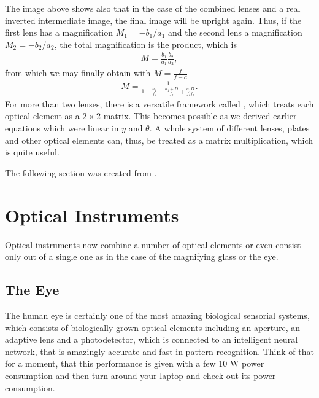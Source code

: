 \documentclass[letterpaper,10pt,english]{sphinxmanual}
\begin{document}
The image above shows also that in the case of the combined lenses and a real inverted intermediate image, the final image will be upright again. Thus, if the first lens has a magnification \(M_1=-b_1/a_1\) and the second lens a magnification \(M_2=-b_2/a_2\), the total magnification is the product, which is
\begin{equation*}
\begin{split}M=\frac{b_1}{a_1}\frac{b_2}{a_2},\end{split}
\end{equation*}
from which we may finally obtain with \(M=\frac{f}{f-a}\)
\begin{equation*}
\begin{split}M=\frac{1}{1-\frac{a_1}{f_1}-\frac{a_1+D}{f_2}+\frac{a_1D}{f_1 f_2}}.\end{split}
\end{equation*}
For more than two lenses, there is a versatile framework called , which treats each optical element as a \(2 \times 2\) matrix. This becomes possible as we derived earlier equations which were linear in \(y\) and \(\theta\). A whole system of different lenses, plates and other optical elements can, thus, be treated as a matrix multiplication, which is quite useful.

The following section was created from .


\section{Optical Instruments}
\label{\detokenize{notebooks/L5/Optical Instruments:Optical-Instruments}}\label{\detokenize{notebooks/L5/Optical Instruments::doc}}
Optical instruments now combine a number of optical elements or even consist only out of a single one as in the case of the magnifying glass or the eye.


\subsection{The Eye}
\label{\detokenize{notebooks/L5/Optical Instruments:The-Eye}}
The human eye is certainly one of the most amazing biological sensorial systems, which consists of biologically grown optical elements including an aperture, an adaptive lens and a photodetector, which is connected to an intelligent neural network, that is amazingly accurate and fast in pattern recognition. Think of that for a moment, that this performance is given with a few 10 W power consumption and then turn around your laptop and check out its power consumption.
\end{document}

